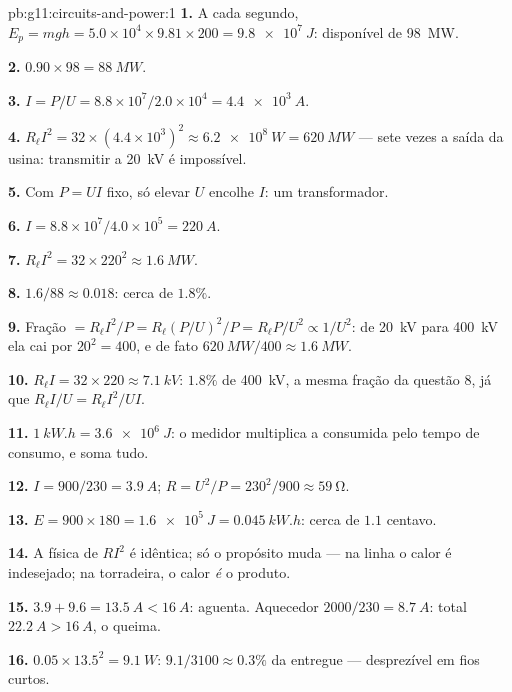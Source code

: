 \begin{solution}{pb:g11:circuits-and-power:1}
\textbf{1.} A cada segundo,
$E_p = mgh = 5.0\times10^{4} \times 9.81 \times 200 = \qty{9.8e7}{J}$:
 disponível de \qty{98}{MW}.

\textbf{2.} $0.90 \times 98 = \qty{88}{MW}$.

\textbf{3.} $I = P/U = 8.8\times10^{7}/2.0\times10^{4} =
\qty{4.4e3}{A}$.

\textbf{4.} $R_\ell I^2 = 32 \times (4.4\times10^{3})^2 \approx
\qty{6.2e8}{W} = \qty{620}{MW}$ --- sete vezes a saída da usina:
transmitir a \qty{20}{kV} é impossível.

\textbf{5.} Com $P = UI$ fixo, só elevar $U$ encolhe $I$: um
transformador.

\textbf{6.} $I = 8.8\times10^{7}/4.0\times10^{5} = \qty{220}{A}$.

\textbf{7.} $R_\ell I^2 = 32 \times 220^2 \approx \qty{1.6}{MW}$.

\textbf{8.} $1.6/88 \approx 0.018$: cerca de $1.8\%$.

\textbf{9.} Fração $= R_\ell I^2/P = R_\ell (P/U)^2/P = R_\ell P/U^2
\propto 1/U^2$: de \qty{20}{kV} para \qty{400}{kV} ela cai por
$20^2 = 400$, e de fato $\qty{620}{MW}/400 \approx \qty{1.6}{MW}$.

\textbf{10.} $R_\ell I = 32 \times 220 \approx \qty{7.1}{kV}$: $1.8\%$
de \qty{400}{kV}, a mesma fração da questão 8, já que
$R_\ell I/U = R_\ell I^2/UI$.

\textbf{11.} $\qty{1}{kW.h} = \qty{3.6e6}{J}$: o medidor multiplica a
 consumida pelo tempo de consumo, e soma tudo.

\textbf{12.} $I = 900/230 = \qty{3.9}{A}$;
$R = U^2/P = 230^2/900 \approx \qty{59}{\ohm}$.

\textbf{13.} $E = 900 \times 180 = \qty{1.6e5}{J} = \qty{0.045}{kW.h}$:
cerca de $1.1$ centavo.

\textbf{14.} A física de $RI^2$ é idêntica; só o propósito muda --- na
linha o calor é indesejado; na torradeira, o calor \emph{é} o produto.

\textbf{15.} $3.9 + 9.6 = \qty{13.5}{A} < \qty{16}{A}$: aguenta.
Aquecedor $2000/230 = \qty{8.7}{A}$: total
$\qty{22.2}{A} > \qty{16}{A}$, o  queima.

\textbf{16.} $0.05 \times 13.5^2 = \qty{9.1}{W}$:
$9.1/3100 \approx 0.3\%$ da  entregue --- desprezível em fios
curtos.


\end{solution}
